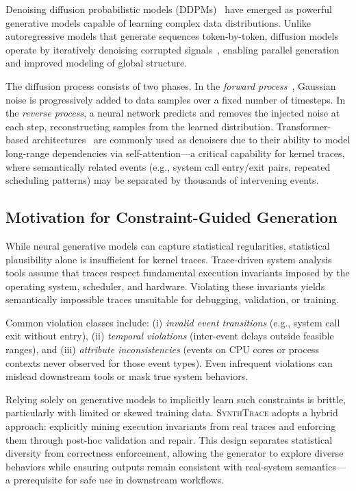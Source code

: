 Denoising diffusion probabilistic models (DDPMs)~\cite{ho2020denoisingdiffusionprobabilisticmodels} have emerged as powerful generative models capable of learning complex data distributions. Unlike autoregressive models that generate sequences token-by-token, diffusion models operate by iteratively denoising corrupted signals~\cite{Song2020Denoising}, enabling parallel generation and improved modeling of global structure.

The diffusion process consists of two phases. In the \emph{forward process}~\cite{Arriola2025Block, sutskever2014sequencesequencelearningneural}, Gaussian noise is progressively added to data samples over a fixed number of timesteps. In the \emph{reverse process}, a neural network predicts and removes the injected noise at each step, reconstructing samples from the learned distribution. Transformer-based architectures~\cite{vaswani2023attentionneed} are commonly used as denoisers due to their ability to model long-range dependencies via self-attention—a critical capability for kernel traces, where semantically related events (e.g., system call entry/exit pairs, repeated scheduling patterns) may be separated by thousands of intervening events.

\subsection{Motivation for Constraint-Guided Generation}
\label{sec:bg-motivation}

While neural generative models can capture statistical regularities, statistical plausibility alone is insufficient for kernel traces. Trace-driven system analysis tools assume that traces respect fundamental execution invariants imposed by the operating system, scheduler, and hardware. Violating these invariants yields semantically impossible traces unsuitable for debugging, validation, or training.

Common violation classes include: (i) \emph{invalid event transitions} (e.g., system call exit without entry), (ii) \emph{temporal violations} (inter-event delays outside feasible ranges), and (iii) \emph{attribute inconsistencies} (events on CPU cores or process contexts never observed for those event types). Even infrequent violations can mislead downstream tools or mask true system behaviors.

Relying solely on generative models to implicitly learn such constraints is brittle, particularly with limited or skewed training data. \textsc{SynthTrace} adopts a hybrid approach: explicitly mining execution invariants from real traces and enforcing them through post-hoc validation and repair. This design separates statistical diversity from correctness enforcement, allowing the generator to explore diverse behaviors while ensuring outputs remain consistent with real-system semantics—a prerequisite for safe use in downstream workflows.
